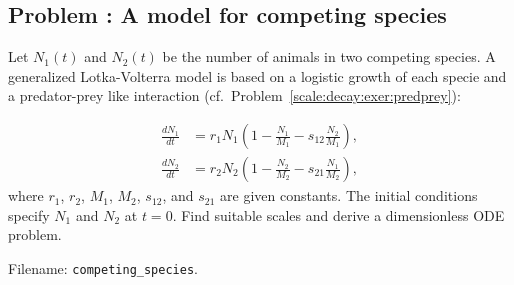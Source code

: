 \documentclass[graybox,envcountchap,sectrefs,final]{svmonodo}
\newenvironment{doconceexercise}{}{}
\newcounter{doconceexercisecounter}
\begin{document}
\begin{doconceexercise}

\subsection*{Problem \thedoconceexercisecounter: A model for competing species}

\label{scale:decay:exer:competing_species}


Let $N_1(t)$ and $N_2(t)$ be the number of animals in two
competing species. A generalized Lotka-Volterra model
is based on a logistic growth of each specie and a predator-prey like
interaction (cf.~Problem~\ref{scale:decay:exer:predprey}):

\begin{align}
\frac{dN_1}{dt} &= r_1N_1\left( 1 - \frac{N_1}{M_1} - s_{12}\frac{N_2}{M_1}\right),\\ 
\frac{dN_2}{dt} &= r_2N_2\left( 1 - \frac{N_2}{M_2} - s_{21}\frac{N_1}{M_2}\right),
\end{align}
where $r_1$, $r_2$, $M_1$, $M_2$, $s_{12}$, and $s_{21}$ are given constants.
The initial conditions specify $N_1$ and $N_2$ at $t=0$.
Find suitable scales and derive a dimensionless ODE problem.


\noindent Filename: \Verb!competing_species!.

\end{doconceexercise}
\end{document}
